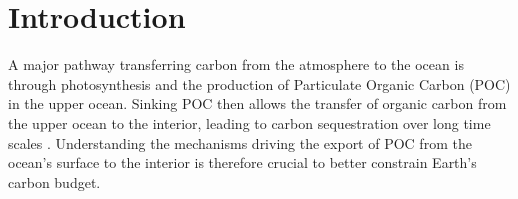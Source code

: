 \documentclass[draft,linenumbers]{agujournal2018}
\begin{document}

\section{Introduction}

A major pathway transferring carbon from the atmosphere to the ocean is through photosynthesis and the production of Particulate Organic Carbon (POC) in the upper ocean. Sinking POC then allows the transfer of organic carbon from the upper ocean to the interior, leading to carbon sequestration over long time scales \citep{Falkowski_1998}. Understanding the mechanisms driving the export of POC from the ocean's surface to the interior is therefore crucial to better constrain Earth's carbon budget.
\end{document}
